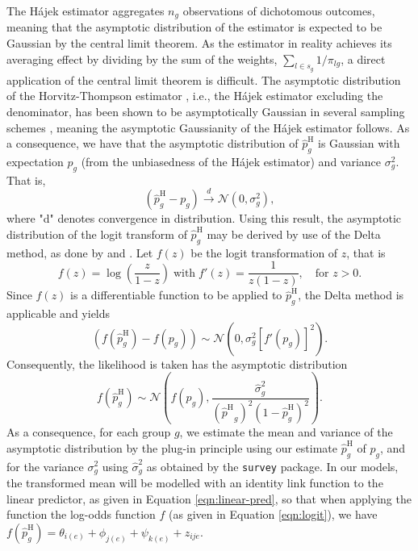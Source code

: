 The Hájek estimator aggregates $n_{g}$ observations of dichotomous outcomes, meaning that the asymptotic distribution of the estimator is expected to be Gaussian by the central limit theorem. As the estimator in reality achieves its averaging effect by dividing by the sum of the weights, $\sum_{l\in s_g}1/\pi_{lg}$, a direct application of the central limit theorem is difficult. The asymptotic distribution of the Horvitz-Thompson estimator \citep{horvitz1952generalization}, i.e., the Hájek estimator excluding the denominator, has been shown to be asymptotically Gaussian in several sampling schemes \citep{BERGER1998209}, meaning the asymptotic Gaussianity of the Hájek estimator follows. As a consequence, we have that the asymptotic distribution of $\hat{p}^{\text{H}}_{g}$ is Gaussian with expectation $p_{g}$ (from the unbiasedness of the Hájek estimator) and variance $\sigma_g^{2}$. That is,
\begin{equation}
    \left(\hat{p}^{\text{H}}_{g} - p_{g}\right) \overset{d}{\rightarrow} \mathcal{N}(0, \sigma^2_{g}),
    \label{eqn:afterCLT}
\end{equation}
where "d" denotes convergence in distribution. Using this result, the asymptotic distribution of the logit transform of $\hat{p}^{\text{H}}_{g}$ may be derived by use of the Delta method, as done by \cite{SurveyDesignMercer} and \cite{gao2023smoothed}. Let $f(z)$ be the logit transformation of $z$, that is
\begin{equation}
    f(z) = \log\left(\frac{z}{1-z}\right)\;\text{with}\; f'(z) = \frac{1}{z(1-z)}, \quad\text{for } z>0.
    \label{eqn:logit}
\end{equation}
Since $f(z)$ is a differentiable function to be applied to $\hat{p}^{\text{H}}_{g}$, the Delta method is applicable and yields
\begin{equation}
    \left(f(\hat{p}^{\text{H}}_{g}) - f(p_{g})\right) \sim \mathcal{N}\left(0, \sigma^2_{g}\left[f'(p_{g})\right]^2\right).
    \label{eqn:DeltaMethod}
\end{equation}
Consequently, the likelihood is taken has the asymptotic distribution
\begin{equation}
    f(\hat{p}^{\text{H}}_{g}) \sim \mathcal{N}\left(f(p_g), \frac{\hat{\sigma}^2_g}{({\hat{p}^\text{H}}_g)^2(1-{\hat{p}_g^\text{H}})^2}\right).
    \label{eqn:asymptoticDistribution}
\end{equation}
As a consequence, for each group $g$, we estimate the mean and variance of the asymptotic distribution by the plug-in principle using our estimate $\hat{p}^{\text{H}}_{g}$ of $p_g$, and for the variance $\sigma_g^2$ using $\hat{\sigma}^2_g$ as obtained by the \texttt{survey} package. In our models, the transformed mean will be modelled with an identity link function to the linear predictor, as given in Equation \eqref{eqn:linear-pred}, so that when applying the function the log-odds function $f$ (as given in Equation \eqref{eqn:logit}), we have $f(\hat{p}^{\text{H}}_{g})=\theta_{i(e)} + \phi_{j(e)} + \psi_{k(e)} + z_{ije}$. 

